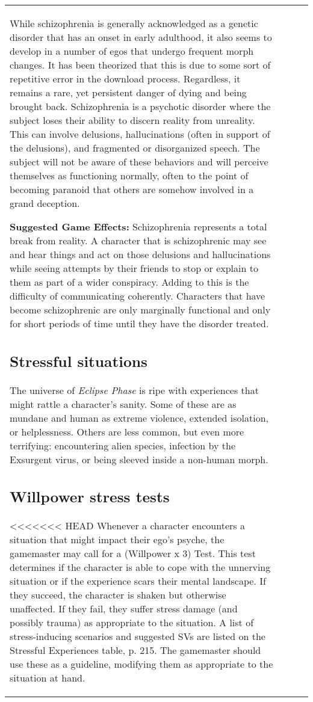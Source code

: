 \begin{table}
\begin{tabular}{|p{8cm}|r|r|r|}
While schizophrenia is generally acknowledged as a genetic disorder that has an onset in early adulthood, it also seems to develop in a number of egos that undergo frequent morph changes. It has been theorized that this is due to some sort of repetitive error in the download process. Regardless, it remains a rare, yet persistent danger of dying and being brought back. Schizophrenia is a psychotic disorder where the subject loses their ability to discern reality from unreality. This can involve delusions, hallucinations (often in support of the delusions), and fragmented or disorganized speech. The subject will not be aware of these behaviors and will perceive themselves as functioning normally, often to the point of becoming paranoid that others are somehow involved in a grand deception. 

\textbf{Suggested Game Effects:} Schizophrenia represents a total break from reality. A character that is schizophrenic may see and hear things and act on those delusions and hallucinations while seeing attempts by their friends to stop or explain to them as part of a wider conspiracy. Adding to this is the difficulty of communicating coherently. Characters that have become schizophrenic are only marginally functional and only for short periods of time until they have the disorder treated. 



\subsection{Stressful situations} \label{sec:stressful-situations} 

The universe of \emph{Eclipse Phase} is ripe with experiences that might rattle a character’s sanity. Some of these are as mundane and human as extreme violence, extended isolation, or helplessness. Others are less common, but even more terrifying: encountering alien species, infection by the Exsurgent virus, or being sleeved inside a non-human morph. 



\subsection{Willpower stress tests} \label{sec:willpower-stress-tests} 

<<<<<<< HEAD Whenever a character encounters a situation that might impact their ego’s psyche, the gamemaster may call for a (Willpower x 3) Test. This test determines if the character is able to cope with the unnerving situation or if the experience scars their mental landscape. If they succeed, the character is shaken but otherwise unaffected. If they fail, they suffer stress damage (and possibly trauma) as appropriate to the situation. A list of stress-inducing scenarios and suggested SVs are listed on the Stressful Experiences table, p. 215. The gamemaster should use these as a guideline, modifying them as appropriate to the situation at hand. 


\end{tabular}
\end{table}
